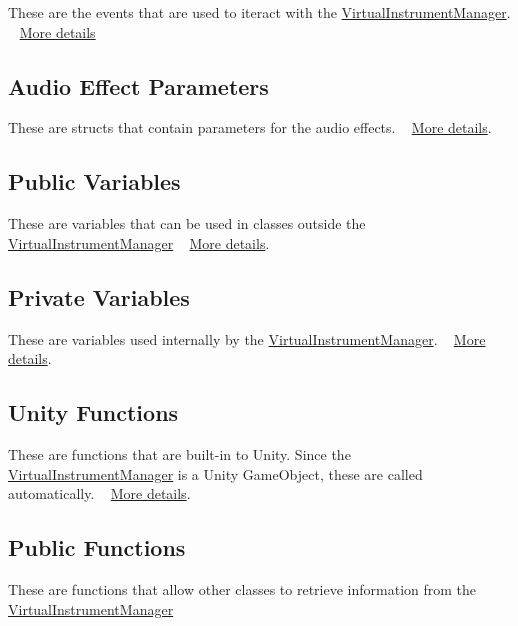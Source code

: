 These are the events that are used to iteract with the \hyperlink{class_virtual_instrument_manager}{Virtual\+Instrument\+Manager}. ~\newline
 \hyperlink{group___v_i_m_events}{More details }\hypertarget{group___v_i_m_DocVIMEffectParams}{}\subsection{Audio Effect Parameters}\label{group___v_i_m_DocVIMEffectParams}
These are structs that contain parameters for the audio effects. ~\newline
 \hyperlink{group__filter_params}{More details}.\hypertarget{group___v_i_m_DocVIMPubVar}{}\subsection{Public Variables}\label{group___v_i_m_DocVIMPubVar}
These are variables that can be used in classes outside the \hyperlink{class_virtual_instrument_manager}{Virtual\+Instrument\+Manager} ~\newline
 \hyperlink{group___v_i_m_pub}{More details}.\hypertarget{group___v_i_m_DocVIMPrivVar}{}\subsection{Private Variables}\label{group___v_i_m_DocVIMPrivVar}
These are variables used internally by the \hyperlink{class_virtual_instrument_manager}{Virtual\+Instrument\+Manager}. ~\newline
 \hyperlink{group___v_i_m_priv}{More details}.\hypertarget{group___v_i_m_DocVIMUnity}{}\subsection{Unity Functions}\label{group___v_i_m_DocVIMUnity}
These are functions that are built-\/in to Unity. Since the \hyperlink{class_virtual_instrument_manager}{Virtual\+Instrument\+Manager} is a Unity Game\+Object, these are called automatically. ~\newline
 \hyperlink{group___v_i_m_unity}{More details}.\hypertarget{group___v_i_m_DocVIMPubFunc}{}\subsection{Public Functions}\label{group___v_i_m_DocVIMPubFunc}
These are functions that allow other classes to retrieve information from the \hyperlink{class_virtual_instrument_manager}{Virtual\+Instrument\+Manager} ~\newline
